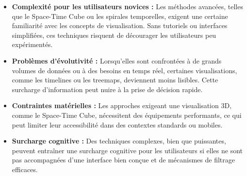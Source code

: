 \documentclass[runningheads]{llncs}
\begin{document}
\begin{itemize}
    \item \textbf{Complexité pour les utilisateurs novices :} Les méthodes avancées, telles que le Space-Time Cube ou les spirales temporelles, exigent une certaine familiarité avec les concepts de visualisation. Sans tutoriels ou interfaces simplifiées, ces techniques risquent de décourager les utilisateurs peu expérimentés.
    
    \item \textbf{Problèmes d’évolutivité :} Lorsqu'elles sont confrontées à de grands volumes de données ou à des besoins en temps réel, certaines visualisations, comme les timelines ou les treemaps, deviennent moins lisibles. Cette surcharge d’information peut nuire à la prise de décision rapide.
    
    \item \textbf{Contraintes matérielles :} Les approches exigeant une visualisation 3D, comme le Space-Time Cube, nécessitent des équipements performants, ce qui peut limiter leur accessibilité dans des contextes standards ou mobiles.
    
    \item \textbf{Surcharge cognitive :} Des techniques complexes, bien que puissantes, peuvent entraîner une surcharge cognitive pour les utilisateurs si elles ne sont pas accompagnées d’une interface bien conçue et de mécanismes de filtrage efficaces.
\end{itemize}


%
%
%
% 
% 
%


\end{document}
